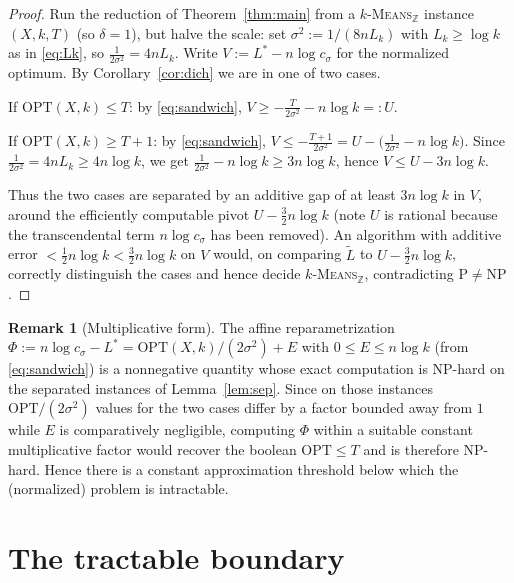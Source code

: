 \documentclass{amsart}
\theoremstyle{plain}
\theoremstyle{definition}
\newtheorem{remark}{Remark}
\newcommand{\Z}{\mathbb{Z}}
\begin{document}
\begin{proof}
Run the reduction of Theorem~\ref{thm:main} from a \textsc{$k$-Means$_{\Z}$}
instance $(X,k,T)$ (so $\delta=1$), but halve the scale: set
$\sigma^{2}:=1/(8nL_{k})$ with $L_{k}\ge\log k$ as in \eqref{eq:Lk}, so
$\tfrac{1}{2\sigma^{2}}=4nL_{k}$. Write $V:=L^{\ast}-n\log c_{\sigma}$ for the
normalized optimum. By Corollary~\ref{cor:dich} we are in one of two cases.

If $\mathrm{OPT}(X,k)\le T$: by \eqref{eq:sandwich},
$V\ge -\tfrac{T}{2\sigma^{2}}-n\log k=:U$.

If $\mathrm{OPT}(X,k)\ge T+1$: by \eqref{eq:sandwich},
$V\le -\tfrac{T+1}{2\sigma^{2}}=U-\big(\tfrac{1}{2\sigma^{2}}-n\log k\big)$. Since
$\tfrac{1}{2\sigma^{2}}=4nL_{k}\ge 4n\log k$, we get
$\tfrac{1}{2\sigma^{2}}-n\log k\ge 3n\log k$, hence $V\le U-3n\log k$.

Thus the two cases are separated by an additive gap of at least $3n\log k$ in $V$,
around the efficiently computable pivot $U-\tfrac32 n\log k$ (note $U$ is rational
because the transcendental term $n\log c_{\sigma}$ has been removed). An algorithm
with additive error $<\tfrac12 n\log k<\tfrac32 n\log k$ on $V$ would, on comparing
$\widetilde L$ to $U-\tfrac32 n\log k$, correctly distinguish the cases and hence
decide \textsc{$k$-Means$_{\Z}$}, contradicting $\mathrm{P}\ne\mathrm{NP}$.
\end{proof}

\begin{remark}[Multiplicative form]
The affine reparametrization $\Phi:=n\log c_{\sigma}-L^{\ast}
=\mathrm{OPT}(X,k)/(2\sigma^{2})+E$ with $0\le E\le n\log k$ (from
\eqref{eq:sandwich}) is a nonnegative quantity whose exact computation is NP-hard
on the separated instances of Lemma~\ref{lem:sep}. Since on those instances
$\mathrm{OPT}/(2\sigma^{2})$ values for the two cases differ by a factor bounded
away from $1$ while $E$ is comparatively negligible, computing $\Phi$ within a
suitable constant multiplicative factor would recover the boolean
$\mathrm{OPT}\le T$ and is therefore NP-hard. Hence there is a constant
approximation threshold below which the (normalized) problem is intractable.
\end{remark}

\section{The tractable boundary}
\end{document}
